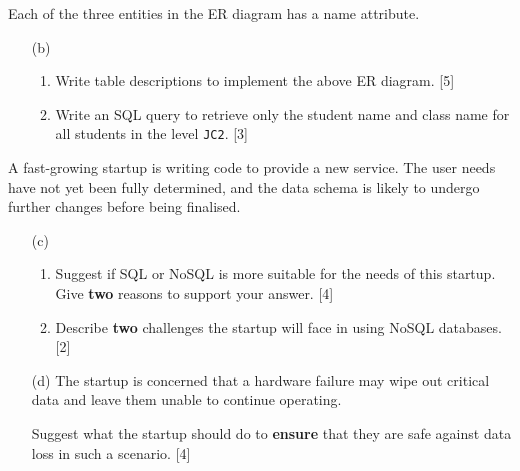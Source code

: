 Each of the three entities in the ER diagram has a name attribute. 
\begin{enumerate}
\item[(b)] {}  
\begin{enumerate}
\item Write table descriptions to implement the above ER diagram. \hfill{}{[}5{]}
\item Write an SQL query to retrieve only the student name and class name
for all students in the level \texttt{JC2}. \hfill{}{[}3{]}
\end{enumerate}
\end{enumerate}
A fast-growing startup is writing code to provide a new service. The
user needs have not yet been fully determined, and the data schema
is likely to undergo further changes before being finalised. 
\begin{enumerate}
\item[(c)]  {}
\begin{enumerate}
\item Suggest if SQL or NoSQL is more suitable for the needs of this startup.
Give \textbf{two} reasons to support your answer.\hfill{} {[}4{]}
\item Describe \textbf{two} challenges the startup will face in using NoSQL
databases.\hfill{} {[}2{]}
\end{enumerate}
\item[(d)]  The startup is concerned that a hardware failure may wipe out critical
data and leave them unable to continue operating. 

Suggest what the startup should do to \textbf{ensure} that they are
safe against data loss in such a scenario.\hfill{} {[}4{]}
\end{enumerate}
